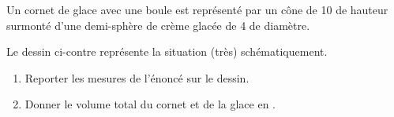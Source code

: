 
\begin{exercice}\label{exosmath-0095}

    \begin{multicols}{2}
    Un cornet de glace avec une boule est représenté par un cône de \unit{10}{\centi\meter} de hauteur surmonté d'une demi-sphère de crème glacée de \unit{4}{\centi\meter} de diamètre.

    Le dessin ci-contre représente la situation (très) schématiquement.

    \begin{enumerate}
        \item
            Reporter les mesures de l'énoncé sur le dessin.
        \item
            Donner le volume total du cornet et de la glace en \centi\cubic\meter.
    \end{enumerate}

    \columnbreak




    \end{multicols}

\end{exercice}
